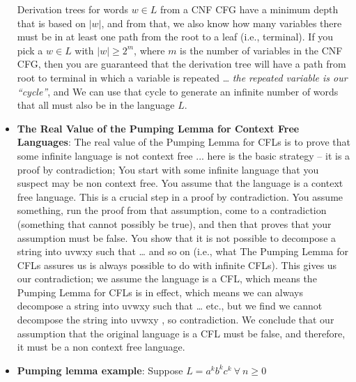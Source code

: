 \documentclass{report}
\begin{document}
\begin{itemize}
                \bigbreak \noindent 
                Derivation trees for words \( w \in L \) from a CNF CFG have a minimum depth that is based on \( |w| \), and from that, we also know how many variables there must be in at least one path from the root to a leaf (i.e., terminal).
                \bigbreak \noindent 
                If you pick a \( w \in L \) with \( |w| \geq 2^m \), where \( m \) is the number of variables in the CNF CFG, then you are guaranteed that the derivation tree will have a path from root to terminal in which a variable is repeated … \textit{the repeated variable is our “cycle”}, and
                \bigbreak \noindent 
                We can use that cycle to generate an infinite number of words that all must also be in the language \( L \).
            \item \textbf{The Real Value of the Pumping Lemma for Context Free Languages}:
                The real value of the Pumping Lemma for CFLs is to prove that some infinite language is
                not context free ... here is the basic strategy – it is a proof by contradiction;
                \bigbreak \noindent 
                You start with some infinite language that you suspect may be non context free.
                \bigbreak \noindent 
                You assume that the language is a context free language.
                \bigbreak \noindent 
                This is a crucial step in a proof by contradiction. You assume something, run the proof from that
                assumption, come to a contradiction (something that cannot possibly be true), and then that proves that
                your assumption must be false.
                \bigbreak \noindent 
                You show that it is not possible to decompose a string into uvwxy such that … and so on (i.e.,
                what The Pumping Lemma for CFLs assures us is always possible to do with infinite CFLs).
                \bigbreak \noindent 
                This gives us our contradiction; we assume the language is a CFL, which means the Pumping Lemma for
                CFLs is in effect, which means we can always decompose a string into uvwxy such that … etc., but we
                find we cannot decompose the string into uvwxy , so contradiction.
                \bigbreak \noindent 
                We conclude that our assumption that the original language is a CFL must be false, and
                therefore, it must be a non context free language.
                \pagebreak 
            \item \textbf{Pumping lemma example}: Suppose $L = a^{k}b^{k}c^{k} \ \forall \ n \geq 0$

\end{itemize}
\end{document}
